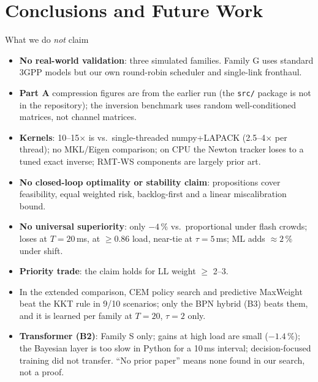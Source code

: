 \documentclass[aspectratio=169,11pt,xcolor=table]{beamer}
\begin{document}
\section{Conclusions and Future Work}

\begin{frame}{What we do \emph{not} claim}
  \footnotesize
  \begin{itemize}
    \item \textbf{No real-world validation}: three simulated families. Family G uses standard 3GPP models but our own round-robin scheduler and single-link fronthaul.
    \item \textbf{Part A} compression figures are from the earlier run (the \texttt{src/} package is not in the repository); the inversion benchmark uses random well-conditioned matrices, not channel matrices.
    \item \textbf{Kernels}: 10--15$\times$ is vs.\ single-threaded numpy+LAPACK (2.5--4$\times$ per thread); no MKL/Eigen comparison; on CPU the Newton tracker loses to a tuned exact inverse; RMT-WS components are largely prior art.
    \item \textbf{No closed-loop optimality or stability claim}: propositions cover feasibility, equal weighted risk, backlog-first and a linear miscalibration bound.
    \item \textbf{No universal superiority}: only $-4$\,\% vs.\ proportional under flash crowds; loses at $T = 20$\,ms, at $\ge 0.86$ load, near-tie at $\tau = 5$\,ms; ML adds $\approx 2$\,\% under shift.
    \item \textbf{Priority trade}: the claim holds for LL weight $\ge$ 2--3.
    \item In the extended comparison, CEM policy search and predictive MaxWeight beat the KKT rule in 9/10 scenarios; only the BPN hybrid (B3) beats them, and it is learned per family at $T = 20$, $\tau = 2$ only.
    \item \textbf{Transformer (B2)}: Family S only; gains at high load are small ($-1.4\,\%$); the Bayesian layer is too slow in Python for a 10\,ms interval; decision-focused training did not transfer. ``No prior paper'' means none found in our search, not a proof.
  \end{itemize}
\end{frame}
\end{document}
